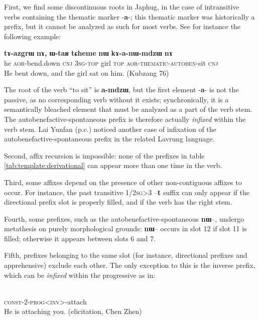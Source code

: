 \documentclass[oldfontcommands,twoside,a4paper,12pt]{article}
\newcommand{\ipa}[1]{{\phon\textbf{#1}}}
\newcommand{\const}{\textsc{const}}
\newcommand{\inv}{\textsc{inv}}
\begin{document}
First, we find some discontinuous roots in Japhug, in the case of intransitive verbs containing the thematic marker -\ipa{a}-; this thematic marker was historically a prefix, but it cannot be analyzed as such for most verbs. See for instance the following example:
\begin{exe}
\ex 
\gll \ipa{ɯʑo}   	\ipa{tɤ-azgrɯ}   	\ipa{nɤ,}   	\ipa{ɯ-taʁ}   	\ipa{tɕheme}   	\ipa{nɯ}   	\ipa{kɤ-a-nɯ-mdzɯ}   	\ipa{nɤ}   \\
he \textsc{aor}-bend.down \textsc{cnj} 3\textsc{sg}-\textsc{top} girl \textsc{top} \textsc{aor}-\textsc{thematic}-\textsc{autoben}-sit \textsc{cnj} \\
\glt He bent down, and the girl sat on him. (Kubzang 76)
\end{exe}
The root of the verb ``to sit'' is \ipa{a-mdzɯ}, but the first element -\ipa{a}- is not the passive, as no corresponding verb without it exists; synchronically, it is a semantically bleached element that must be analyzed as a part of the verb stem. The autobenefactive-spontaneous prefix is therefore actually \textit{infixed} within the verb stem. Lai Yunfan (p.c.) noticed another case of infixation of the autobenefactive-spontaneous prefix in the related Lavrung language.

 
Second, affix recursion is impossible: none of the prefixes in table \ref{tab:template:derivational} can appear more than one time in the verb. 
 

 Third, some affixes depend on the presence of other non-contiguous affixes to occur. For instance, the past transitive 1/2\textsc{sg}>3 --\ipa{t} suffix can only appear if the directional prefix slot is properly filled, and if the verb has the right stem. 
 
 Fourth, some prefixes, such as the autobenefactive-spontaneous \ipa{nɯ}--, undergo metathesis on purely morphological grounds:  \ipa{nɯ}-- occurs in slot 12 if slot 11 is filled; otherwise it appears between slots 6 and 7.  

Fifth, prefixes belonging to the same slot (for instance, directional prefixes and apprehensive) exclude each other. The only exception to this is the inverse prefix, which can be \textit{infixed} within the progressive as in:
\begin{exe}
\ex 
\gll  \ipa{ɲɯ-tɯ-ɤ́<wɣ>sɯ-zgroʁ}    \\
\const{}-2-\textsc{prog}<\inv{}>-attach \\
\glt He is attaching you. (elicitation, Chen Zhen)
\end{exe}
\end{document}

